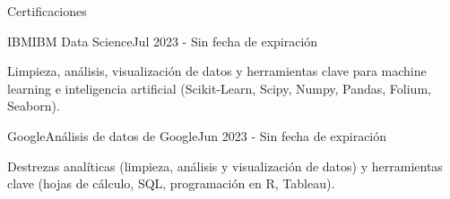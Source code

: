 \documentclass[]{kyvernitis-resume}
\begin{document}
\begin{section}{Certificaciones}
    \begin{subsectionnobullet}{IBM}{IBM Data Science}{Jul 2023 - Sin fecha de expiración}{}
        \item Limpieza, análisis, visualización de datos y herramientas clave para machine learning e inteligencia artificial (Scikit-Learn, Scipy, Numpy, Pandas, Folium, Seaborn).
    \end{subsectionnobullet}
    
    \begin{subsectionnobullet}{Google}{Análisis de datos de Google}{Jun 2023 - Sin fecha de expiración}{}
        \item Destrezas analíticas (limpieza, análisis y visualización de datos) y herramientas clave (hojas de cálculo, SQL, programación en R, Tableau).
    \end{subsectionnobullet}
\end{section}


\end{document}

